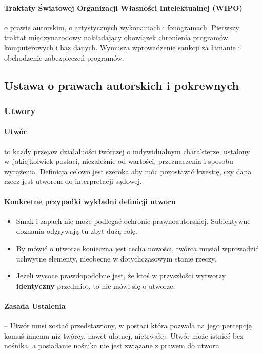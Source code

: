 \documentclass{article}
\begin{document}
\paragraph{Traktaty Światowej Organizacji Własności Intelektualnej (WIPO)}
o prawie autorskim, o artystycznych wykonaniach i fonogramach.
Pierwszy traktat międzynarodowy nakładający obowiązek chronienia programów komputerowych i baz danych.
Wymusza wprowadzenie sankcji za łamanie i obchodzenie zabezpieczeń programów.

\subsection{Ustawa o prawach autorskich i pokrewnych}

\subsubsection{Utwory}

\paragraph{Utwór} to każdy przejaw działalności twórczej o indywidualnym charakterze, ustalony w~jakiejkolwiek postaci,
niezależnie od wartości, przeznaczenia i sposobu wyrażenia.
Definicja celowo jest szeroka aby móc pozostawić kwestię, czy dana rzecz jest utworem do interpretacji sądowej.

\paragraph{Konkretne przypadki wykładni definicji utworu}
\begin{itemize}
  \item Smak i zapach nie może podlegać ochronie prawnoautorskiej. Subiektywne doznania odgrywają tu zbyt dużą rolę.
  \item By mówić o utworze konieczna jest cecha nowości, twórca musiał wprowadzić uchwytne elementy, nieobecne w dotychczasowym stanie rzeczy.
  \item Jeżeli wysoce prawdopodobne jest, że ktoś w przyszłości wytworzy \textbf{identyczny} przedmiot, to nie mówi się o utworze.
\end{itemize}

\paragraph{Zasada Ustalenia}
-- Utwór musi zostać przedstawiony, w postaci która pozwala na jego percepcję komuś innemu niż twórcy, nawet ulotnej, nietrwałej.
Utwór może istnieć bez nośnika, a posiadanie nośnika nie jest związane z prawem do utworu.
\end{document}
